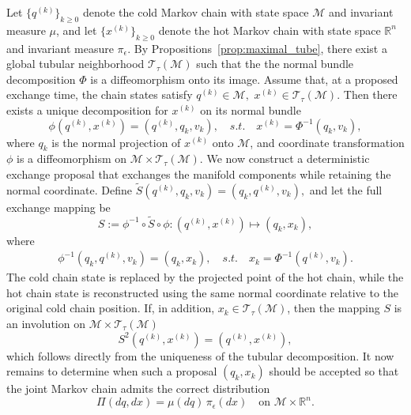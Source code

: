 \documentclass[12pt]{article}
\begin{document}
Let $\{q^{(k)}\}_{k\ge0}$ denote the cold Markov chain with state space
$\mathcal{M}$ and invariant measure $\mu$, and let $\{x^{(k)}\}_{k\ge0}$ denote the
hot Markov chain with state space $\mathbb{R}^n$ and invariant measure
$\pi_\epsilon$. By Propositions~\ref{prop:maximal_tube}, there exist a global tubular neighborhood $\mathcal{T}_\tau(\mathcal{M})$ such that the
 the normal
bundle decomposition $\Phi$ is a diffeomorphism onto its image.
Assume that, at a proposed exchange time, the chain states satisfy
\(
q^{(k)}\in\mathcal{M},\)
\(x^{(k)}\in\mathcal{T}_\tau(\mathcal{M}).
\)
Then there exists a unique decomposition for $x^{(k)}$ on its normal bundle 
\begin{equation}\label{eq:phi}
    \phi(q^{(k)},x^{(k)})=(q^{(k)}, q_k, v_k), \quad s.t. \quad x^{(k)} = \Phi^{-1}(q_k,v_k) , 
\end{equation} 
where $q_k$ is the normal projection of $x^{(k)}$ onto $\mathcal{M}$, and coordinate transformation $\phi$ is a diffeomorphism on $\mathcal{M}\times\mathcal{T}_\tau(\mathcal{M})$.
We now construct a deterministic exchange proposal that exchanges the manifold
components while retaining the normal coordinate. Define
\(
\widetilde S(q^{(k)}, q_k, v_k) = (q_k, q^{(k)}, v_k),
\)
and let the full exchange mapping be
\begin{equation}\label{eq:exachange}
    S := \phi^{-1}\circ \widetilde S\circ \phi :
(q^{(k)},x^{(k)}) \longmapsto (q_k, x_k),
\end{equation}
where
\begin{equation}\label{eq:phiinve} 
\begin{aligned} \phi^{-1}(q_k, q^{(k)}, v_k) = (q_k, x_k), \quad s.t. \quad x_k = \Phi^{-1}(q^{(k)},v_k). 
\end{aligned} 
\end{equation}
The cold chain state is replaced by the projected point of the hot
chain, while the hot chain state is reconstructed using the same normal
coordinate relative to the original cold chain position. If, in addition,
$x_k\in\mathcal{T}_\tau(\mathcal{M})$, then the mapping $S$ is an involution on
$\mathcal{M}\times\mathcal{T}_\tau(\mathcal{M})$
\begin{equation}\label{eq:invo}
    S^2(q^{(k)},x^{(k)}) = (q^{(k)},x^{(k)}),
\end{equation}
which follows directly from the uniqueness of the tubular decomposition.
It now remains to determine when such a proposal $(q_k,x_k)$ should be accepted
so that the joint Markov chain admits the correct distribution
\begin{equation}\label{eq:pi}
    \Pi(dq,dx) = \mu(dq)\,\pi_\epsilon(dx)
\quad \text{on } \mathcal{M}\times\mathbb{R}^n.
\end{equation}
\end{document}
